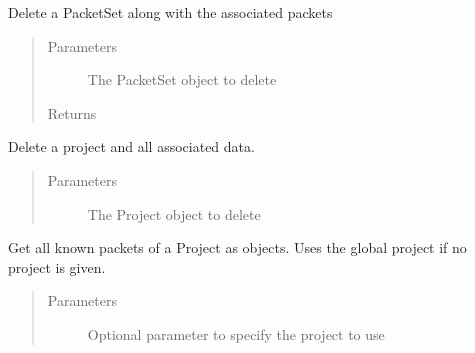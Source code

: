 \documentclass[letterpaper,10pt,english]{sphinxmanual}
\begin{document}
\begin{fulllineitems}
\begin{fulllineitems}
\end{fulllineitems}


\begin{fulllineitems}
\label{\detokenize{src:src.Database.Database.deletePacketSet}}
Delete a PacketSet along with the associated packets
\begin{quote}\begin{description}
\item[{Parameters}] \leavevmode
{} \textendash{} The PacketSet object to delete

\item[{Returns}] \leavevmode


\end{description}\end{quote}

\end{fulllineitems}


\begin{fulllineitems}
\label{\detokenize{src:src.Database.Database.deleteProjectAndData}}
Delete a project and all associated data.
\begin{quote}\begin{description}
\item[{Parameters}] \leavevmode
{} \textendash{} The Project object to delete

\end{description}\end{quote}

\end{fulllineitems}


\begin{fulllineitems}
\label{\detokenize{src:src.Database.Database.getKnownPackets}}
Get all known packets of a Project as objects.
Uses the global project if no project is given.
\begin{quote}\begin{description}
\item[{Parameters}] \leavevmode
{} \textendash{} Optional parameter to specify the project to use


\end{description}
\end{quote}
\end{fulllineitems}
\end{fulllineitems}
\end{document}
